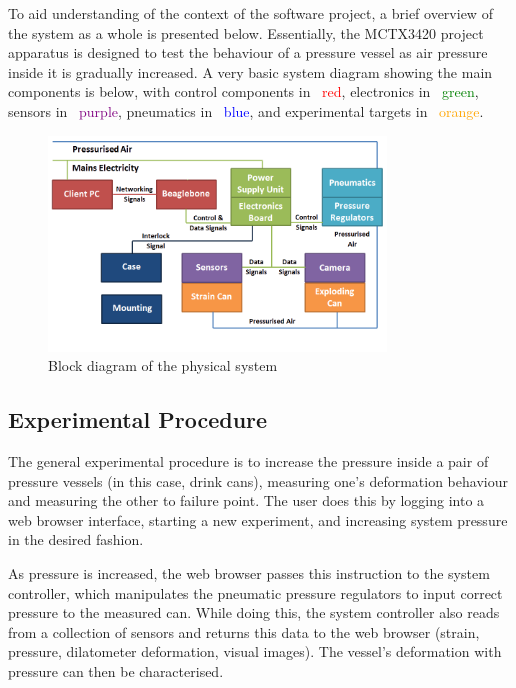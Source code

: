 To aid understanding of the context of the software project, a brief overview of the system as a whole is presented below. Essentially, the MCTX3420 project apparatus is designed to test the behaviour of a pressure vessel as air pressure inside it is gradually increased. A very basic system diagram showing the main components is below, with control components in \textcolor{red}{ red}, electronics in \textcolor{green}{ green}, sensors in \textcolor{Purple}{ purple}, pneumatics in  \textcolor{blue}{ blue}, and experimental targets in \textcolor{Orange}{ orange}.

\begin{figure}[H]
	\centering
	\includegraphics[width=0.8\textwidth]{figures/system_overview.png}
	\caption{Block diagram of the physical system} 
	\label{system_overview.png}
\end{figure}

\subsection{Experimental Procedure}

The general experimental procedure is to increase the pressure inside a pair of pressure vessels (in this case, drink cans), measuring one's deformation behaviour and measuring the other to failure point. The user does this by logging into a web browser interface, starting a new experiment, and increasing system pressure in the desired fashion.

As pressure is increased, the web browser passes this instruction to the system controller, which manipulates the pneumatic pressure regulators to input correct pressure to the measured can. While doing this, the system controller also reads from a collection of sensors and returns this data to the web browser (strain, pressure, dilatometer deformation, visual images). The vessel’s deformation with pressure can then be characterised.

